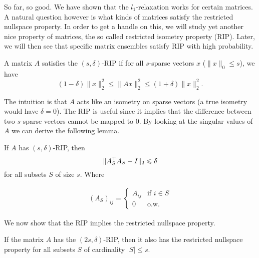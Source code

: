 So far, so good. We have shown that the $l_1$-relaxation works for certain matrices. A natural question however is what kinds of matrices satisfy the restricted nullspace property. In order to get a handle on this, we will study yet another nice property of matrices, the so called restricted isometry property (RIP). Later, we will then see that specific matrix ensembles satisfy RIP with high probability.
\begin{definition}
A matrix $A$ satisfies the $(s, \delta)$-RIP if for all $s$-sparse vectors $x$ ($\|x\|_0 \le s$), we have
\[
(1 - \delta)\|x\|_2^2 \le \|Ax\|_2^2 \le (1 + \delta) \|x\|_2^2.
\]
\end{definition}
The intuition is that $A$ acts like an isometry on sparse vectors (a true isometry would have $\delta = 0$). The RIP is useful since it implies that the difference between two $s$-sparse vectors cannot be mapped to $0$. By looking at the singular values of $A$ we can derive the following lemma.
\begin{lemma}
\label{RIPlemma}
If $A$ has $(s, \delta)$-RIP, then
\[
\|A_S^{\top}A_S - I\|_2 \leqslant \delta
\]
for all subsets $S$ of size $s$. Where

\begin{align*}
    (A_S)_{ij} = \begin{cases}
    A_{ij} & \text{if } i \in S \\
    0 & \text{o.w}.
    \end{cases}
\end{align*}
\end{lemma}
We now show that the RIP implies the restricted nullspace property. 
\begin{theorem}
If the matrix $A$ has the $(2s, \delta)$-RIP, then it also has the restricted nullspace property for all subsets $S$ of cardinality $|S| \le s$.
\end{theorem}
